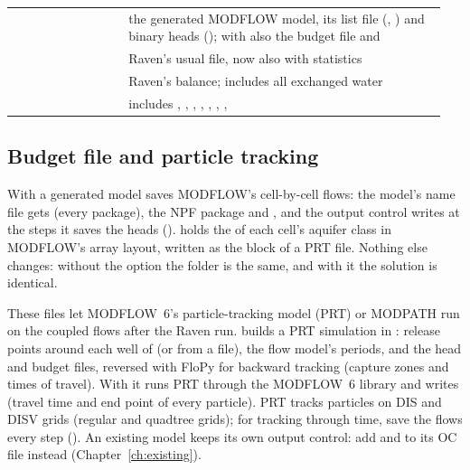\begin{table}[!htbp]
\begin{tabular}{P{0.25\linewidth}P{0.698\linewidth}}
 & the generated MODFLOW model, its list file (, ) and binary heads (); with  also the budget file  and \\
 & Raven's usual file, now also with  statistics\\
 & Raven's balance; includes all exchanged water\\
 & includes , , , , , , , \\\bottomrule
\end{tabular}
\end{table}

\subsection{Budget file and particle tracking}\label{sec:budgetfile}
With  a generated model saves MODFLOW's cell-by-cell flows: the model's name file gets
 (every package), the NPF package  and , and the output
control writes  at the steps it saves the heads ().  holds the
 of each cell's aquifer class in MODFLOW's array layout, written as the  block of a PRT  file.
Nothing else changes: without the option the  folder is the same, and with it the solution is identical.

These files let MODFLOW~6's particle-tracking model (PRT) or MODPATH run on the coupled flows after the Raven run.
 builds a PRT simulation in
: release points around each well of  (or from a file), the flow model's periods, and
the head and budget files, reversed with FloPy for backward tracking (capture zones and times of travel). With 
it runs PRT through the MODFLOW~6 library and writes  (travel time and end point of every particle). PRT
tracks particles on DIS and DISV grids (regular and quadtree grids); for tracking through time, save the flows every step
(). An existing model keeps its own output control: add  and
 to its OC file instead (Chapter~\ref{ch:existing}).

